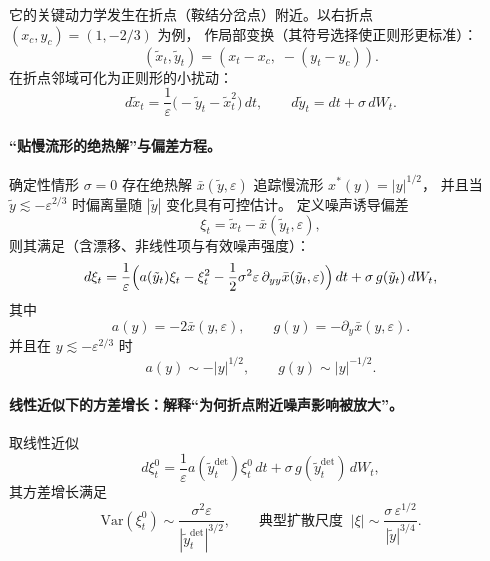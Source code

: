 它的关键动力学发生在折点（鞍结分岔点）附近。以右折点 $(x_c,y_c)=(1,-2/3)$ 为例，
作局部变换（其符号选择使正则形更标准）：
\[
(\tilde x_t,\tilde y_t)=(x_t-x_c,\; -(y_t-y_c)).
\]
在折点邻域可化为正则形的小扰动：
\begin{equation}\label{eq:BG-620}
	d\tilde x_t=\frac{1}{\varepsilon}\bigl(-\tilde y_t-\tilde x_t^2\bigr)\,dt,\qquad
	d\tilde y_t=dt+\sigma\,dW_t .
\end{equation}

\paragraph{“贴慢流形的绝热解”与偏差方程。}
确定性情形 $\sigma=0$ 存在绝热解 $\bar x(\tilde y,\varepsilon)$ 追踪慢流形 $x^\ast(y)=|y|^{1/2}$，
并且当 $\tilde y\lesssim -\varepsilon^{2/3}$ 时偏离量随 $|\tilde y|$ 变化具有可控估计。
定义噪声诱导偏差
\[
\xi_t=\tilde x_t-\bar x(\tilde y_t,\varepsilon),
\]
则其满足（含漂移、非线性项与有效噪声强度）：
\begin{equation}\label{eq:BG-621}
	d\xi_t=\frac{1}{\varepsilon}\Bigl(a(\tilde y_t)\xi_t-\xi_t^2-\frac{1}{2}\sigma^2\varepsilon\,\partial_{yy}\bar x(\tilde y_t,\varepsilon)\Bigr)\,dt
	+\sigma\,g(\tilde y_t)\,dW_t,
\end{equation}
其中
\begin{equation}\label{eq:BG-622-623}
	a(y)=-2\bar x(y,\varepsilon),\qquad g(y)=-\partial_y\bar x(y,\varepsilon).
\end{equation}
并且在 $y\lesssim -\varepsilon^{2/3}$ 时
\[
a(y)\sim -|y|^{1/2},\qquad g(y)\sim |y|^{-1/2}.
\]

\paragraph{线性近似下的方差增长：解释“为何折点附近噪声影响被放大”。}
取线性近似
\begin{equation}\label{eq:BG-624}
	d\xi^{0}_t=\frac{1}{\varepsilon}a(\tilde y^{\mathrm{det}}_t)\xi^{0}_t\,dt+\sigma\,g(\tilde y^{\mathrm{det}}_t)\,dW_t,
\end{equation}
其方差增长满足
\[
\mathrm{Var}(\xi^{0}_t)\sim \frac{\sigma^2\varepsilon}{|\tilde y^{\mathrm{det}}_t|^{3/2}},
\qquad
\text{典型扩散尺度 }\ |\xi|\sim \frac{\sigma\,\varepsilon^{1/2}}{|\tilde y|^{3/4}}.
\]

